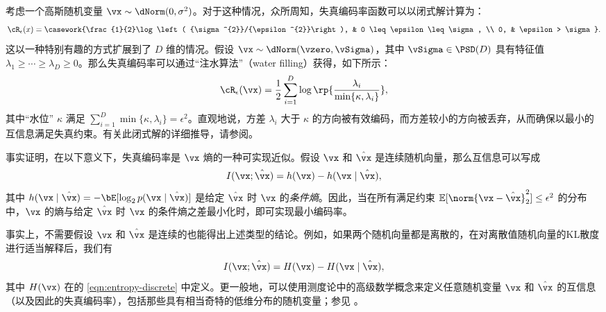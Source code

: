 \documentclass[../../book-main_zh.tex]{subfiles}
\begin{document}
\begin{example}\label{ex:gaussian_rate_distortion}
    考虑一个高斯随机变量 \(\vx \sim \dNorm(0, \sigma^{2})\)。对于这种情况，众所周知，失真编码率函数可以以闭式解计算为：
    \begin{equation}
        \cR_{\epsilon}(x) =
        \casework{\frac{1}{2}\log\left(
            {\sigma^{2}}/{\epsilon^{2}}\right), & 0 \leq
        \epsilon \leq \sigma, \\ 0, & \epsilon > \sigma}.
    \end{equation}
    这以一种特别有趣的方式扩展到了 \(D\) 维的情况。假设 \(\vx \sim \dNorm(\vzero, \vSigma)\)，其中 \(\vSigma \in \PSD(D)\) 具有特征值 \(\lambda_{1} \geq \cdots \geq \lambda_{D} \geq 0\)。那么失真编码率可以通过“注水算法”（water filling）获得，如下所示：
    \begin{equation}
        \cR_{\epsilon}(\vx) = \frac{1}{2} \sum_{i =
        1}^{D}\log\rp{\frac{\lambda_{i}}{\min\{\kappa, \lambda_{i}\}}},
    \end{equation}
    其中“水位” \(\kappa\) 满足 \(\sum_{i = 1}^{D}\min\{\kappa, \lambda_{i}\} = \epsilon^{2}\)。直观地说，方差 \(\lambda_{i}\) 大于 \(\kappa\) 的方向被有效编码，而方差较小的方向被丢弃，从而确保以最小的互信息满足失真约束。有关此闭式解的详细推导，请参阅。
\end{example}

\begin{remark}
    事实证明，在以下意义下，失真编码率是 $\vx$ 熵的一种可实现近似。假设 $\vx$ 和 $\hat{\vx}$ 是连续随机向量，那么互信息可以写成
    \begin{equation}\label{eq:information-entropy}
        I(\vx; \hat\vx) = h(\vx) - h(\vx \mid \hat \vx),
    \end{equation}
    其中 $h(\vx \mid \hat \vx) = -\bE[\log_2 p(\vx \mid \hat\vx)]$ 是给定 $\hat \vx$ 时 $\vx$ 的\textit{条件熵}。因此，当在所有满足约束 $\mathbb{E} [\norm{\vx- \hat \vx}_2^2] \le \epsilon^2$ 的分布中，$\vx$ 的熵与给定 $\hat \vx$ 时 $\vx$ 的条件熵之差最小化时，即可实现最小编码率。

    事实上，不需要假设 $\vx$ 和 $\hat \vx$ 是连续的也能得出上述类型的结论。例如，如果两个随机向量都是离散的，在对离散值随机向量的KL散度进行适当解释后，我们有
    \begin{equation}\label{eq:mutual}
        I(\vx; \hat\vx) = H(\vx) - H(\vx \mid \hat \vx),
    \end{equation}
    其中 $H(\vx)$ 在的 \eqref{eqn:entropy-discrete} 中定义。更一般地，可以使用测度论中的高级数学概念来定义任意随机变量 $\vx$ 和 $\hat \vx$ 的互信息（以及因此的失真编码率），包括那些具有相当奇特的低维分布的随机变量；参见 \textcite[\S 8.5]{Cover-Thomas}。
\end{remark}
\end{document}
